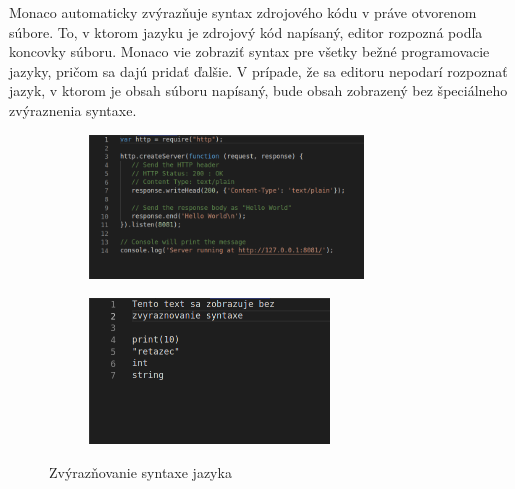 Monaco automaticky zvýrazňuje syntax zdrojového kódu v práve otvorenom súbore. To, v ktorom jazyku
je zdrojový kód napísaný, editor rozpozná podľa koncovky súboru. Monaco vie zobraziť syntax pre
všetky bežné programovacie jazyky, pričom sa dajú pridať ďalšie. V prípade, že sa editoru nepodarí
rozpoznať jazyk, v ktorom je obsah súboru napísaný, bude obsah zobrazený bez špeciálneho zvýraznenia
syntaxe.
\begin{figure}[H]
\centering
\begin{subfigure}{.5\textwidth}
  \centering
  \includegraphics[width=0.8\textwidth]{images/jazyk_js}
  \label{obr:jazyk_js}
\end{subfigure}%
\begin{subfigure}{.5\textwidth}
  \centering
  \includegraphics[width=0.7\textwidth]{images/jazyk_ziaden}
  \label{obr:jazyk_ziaden}
\end{subfigure}
\caption{Zvýrazňovanie syntaxe jazyka}
\end{figure}

